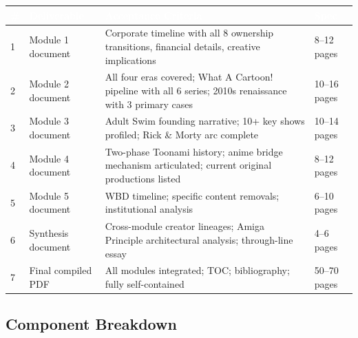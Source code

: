 \documentclass[11pt,letterpaper]{article}
\newcommand{\tableheader}[1]{\textbf{\sffamily\textcolor{white}{#1}}}
\begin{document}
\begin{center}
\begin{tabularx}{\textwidth}{C{0.5cm}L{4cm}XL{3cm}}
\toprule
{}
\tableheader{\#} & \tableheader{Deliverable} & \tableheader{Acceptance Criteria} & \tableheader{Spec} \\
 & Module 1 document & Corporate timeline with all 8 ownership transitions, financial details, creative implications & 8--12 pages \\
2 & Module 2 document & All four eras covered; What A Cartoon! pipeline with all 6 series; 2010s renaissance with 3 primary cases & 10--16 pages \\
3 & Module 3 document & Adult Swim founding narrative; 10+ key shows profiled; Rick \& Morty arc complete & 10--14 pages \\
4 & Module 4 document & Two-phase Toonami history; anime bridge mechanism articulated; current original productions listed & 8--12 pages \\
5 & Module 5 document & WBD timeline; specific content removals; institutional analysis & 6--10 pages \\
6 & Synthesis document & Cross-module creator lineages; Amiga Principle architectural analysis; through-line essay & 4--6 pages \\
7 & Final compiled PDF & All modules integrated; TOC; bibliography; fully self-contained & 50--70 pages \\
\bottomrule
\end{tabularx}
\end{center}

\subsection{Component Breakdown}
\end{document}
